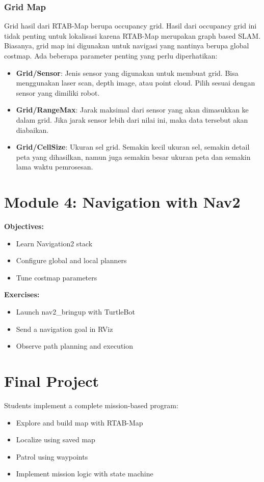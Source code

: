 \documentclass{article}
\begin{document}
\subsubsection{Grid Map}
Grid hasil dari RTAB-Map berupa occupancy grid. Hasil dari occupancy grid ini tidak penting untuk lokalisasi karena RTAB-Map merupakan graph based SLAM. Biasanya, grid map ini digunakan untuk navigasi yang nantinya berupa global costmap. Ada beberapa parameter penting yang perlu diperhatikan:
\begin{itemize}
  \item \textbf{Grid/Sensor}: Jenis sensor yang digunakan untuk membuat grid. Bisa menggunakan laser scan, depth image, atau point cloud. Pilih sesuai dengan sensor yang dimiliki robot.
  \item \textbf{Grid/RangeMax}: Jarak maksimal dari sensor yang akan dimasukkan ke dalam grid. Jika jarak sensor lebih dari nilai ini, maka data tersebut akan diabaikan. 
  \item \textbf{Grid/CellSize}: Ukuran sel grid. Semakin kecil ukuran sel, semakin detail peta yang dihasilkan, namun juga semakin besar ukuran peta dan semakin lama waktu pemrosesan.
\end{itemize}

\section{Module 4: Navigation with Nav2}
\textbf{Objectives:}
\begin{itemize}
  \item Learn Navigation2 stack
  \item Configure global and local planners
  \item Tune costmap parameters
\end{itemize}
\textbf{Exercises:}
\begin{itemize}
  \item Launch nav2\_bringup with TurtleBot
  \item Send a navigation goal in RViz
  \item Observe path planning and execution
\end{itemize}

\section*{Final Project}
Students implement a complete mission-based program:
\begin{itemize}
  \item Explore and build map with RTAB-Map
  \item Localize using saved map
  \item Patrol using waypoints
  \item Implement mission logic with state machine
\end{itemize}
\end{document}
